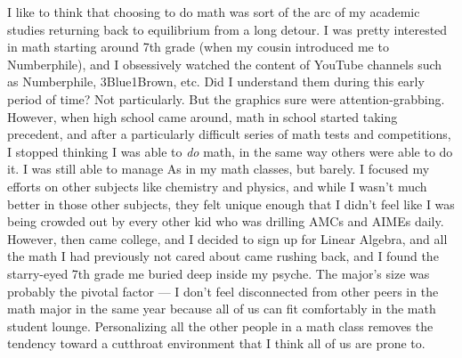 \documentclass[10pt]{extarticle}
\title{}
\author{Avinash Iyer}
\date{}
\begin{document}
  I like to think that choosing to do math was sort of the arc of my academic studies returning back to equilibrium from a long detour. I was pretty interested in math starting around 7th grade (when my cousin introduced me to Numberphile), and I obsessively watched the content of YouTube channels such as Numberphile, 3Blue1Brown, etc. Did I understand them during this early period of time? Not particularly. But the graphics sure were attention-grabbing.\\

  However, when high school came around, math in school started taking precedent, and after a particularly difficult series of math tests and competitions, I stopped thinking I was able to \textit{do} math, in the same way others were able to do it. I was still able to manage As in my math classes, but barely. I focused my efforts on other subjects like chemistry and physics, and while I wasn't much better in those other subjects, they felt unique enough that I didn't feel like I was being crowded out by every other kid who was drilling AMCs and AIMEs daily.\\

  However, then came college, and I decided to sign up for Linear Algebra, and all the math I had previously not cared about came rushing back, and I found the starry-eyed 7th grade me buried deep inside my psyche. The major's size was probably the pivotal factor --- I don't feel disconnected from other peers in the math major in the same year because all of us can fit comfortably in the math student lounge. Personalizing all the other people in a math class removes the tendency toward a cutthroat environment that I think all of us are prone to.\\
\end{document}
